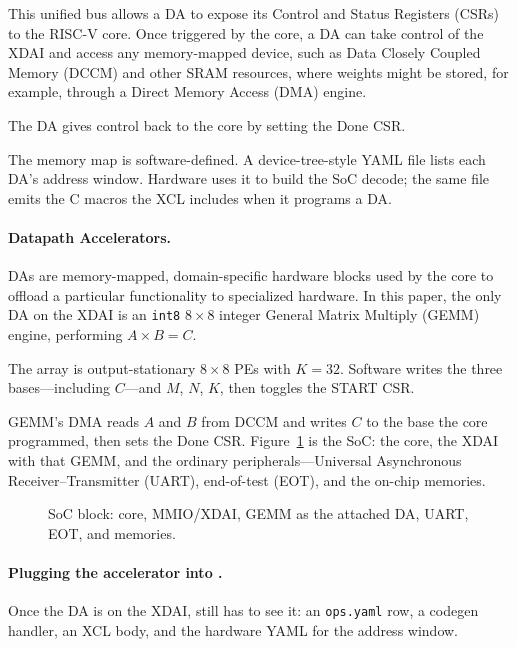 This unified bus allows a {DA} to expose its Control and Status Registers ({CSRs})
to the RISC-V core. Once triggered by the core, a {DA} can take control of the
{XDAI} and access any memory-mapped device, such as Data Closely Coupled Memory ({DCCM}) and other {SRAM} resources,
where weights might be stored, for example, through a Direct Memory Access ({DMA}) engine.

The {DA} gives control back to the core by setting the {Done} {CSR}.

The memory map is software-defined.
A device-tree-style YAML file lists each {DA}'s address window.
Hardware uses it to build the {SoC} decode; the same file emits the
{C} macros the {XCL} includes when it programs a {DA}.


\paragraph{Datapath Accelerators.}
DAs are memory-mapped, domain-specific hardware blocks used by the core to offload a
particular functionality to specialized hardware.
In this paper, the only {DA} on the {XDAI} is an \texttt{int8} $8{\times}8$ integer
General Matrix Multiply ({GEMM}) engine, performing $A \times B = C$. 

The array is output-stationary $8{\times}8$ {PE}s with $K{=}32$.
Software writes the three bases---including $C$---and $M$, $N$, $K$,
then toggles the {START} {CSR}.

{GEMM}'s {DMA} reads $A$ and $B$ from {DCCM} and writes $C$ to the
base the core programmed, then sets the {Done} {CSR}.
Figure~\ref{fig:soc-block} is the {SoC}: the core, the {XDAI} with that
{GEMM}, and the ordinary peripherals---Universal Asynchronous Receiver--Transmitter ({UART}), end-of-test ({EOT}),
and the on-chip memories.

\begin{figure}[H]
  \centering
  
  \caption{{SoC} block: core, {MMIO}/{XDAI}, {GEMM} as the attached
    {DA}, {UART}, {EOT}, and memories.}
  \label{fig:soc-block}
\end{figure}



\paragraph{Plugging the accelerator into \pyv{}.}
Once the {DA} is on the {XDAI}, \pyv{} still has to see it:
an \texttt{ops.yaml} row, a codegen handler, an {XCL} body, and the
hardware {YAML} for the address window.

